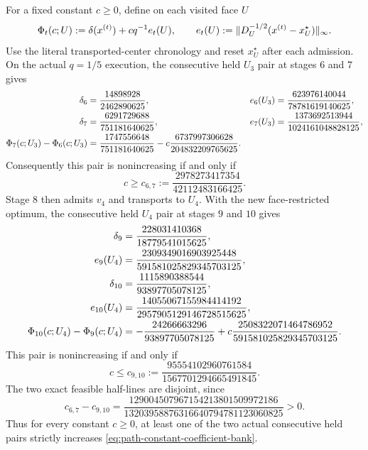 \begin{proposition}
\label{prop:path-no-constant-coefficient-bank}
For a fixed constant $c\geq0$, define on each visited face $U$
\begin{equation}
 \Phi_t(c;U):=\delta(x^{(t)})+c q^{-1}e_t(U),
 \qquad
 e_t(U):=\lVert D_U^{-1/2}(x^{(t)}-x_U^\star)\rVert_\infty .
 \label{eq:path-constant-coefficient-bank}
\end{equation}
Use the literal transported-center chronology and reset $x_U^\star$ after
each admission.  On the actual $q=1/5$ execution, the consecutive held
$U_3$ pair at stages $6$ and $7$ gives
\begin{align}
 \delta_6&=\frac{14898928}{2462890625},
 &e_6(U_3)&=\frac{623976140044}{78781619140625},
 \notag\\
 \delta_7&=\frac{6291729688}{751181640625},
 &e_7(U_3)&=\frac{1373692513944}{1024161048828125},
 \notag\\
 \Phi_7(c;U_3)-\Phi_6(c;U_3)
 &=\frac{1747556648}{751181640625}
   -c\frac{6737997306628}{204832209765625}.
 \label{eq:path-constant-coefficient-stage-seven-constraint}
\end{align}
Consequently this pair is nonincreasing if and only if
\begin{equation}
 c\geq c_{6,7}:=
 \frac{2978273417354}{42112483166425}.
 \label{eq:path-constant-coefficient-stage-seven-lower}
\end{equation}
Stage $8$ then admits $v_4$ and transports to $U_4$.  With the new
face-restricted optimum, the consecutive held $U_4$ pair at stages $9$ and
$10$ gives
\begin{align}
 \delta_9&=\frac{228031410368}{18779541015625},
 \notag\\
 e_9(U_4)&=\frac{2309349016903925448}{591581025829345703125},
 \notag\\
 \delta_{10}&=\frac{1115890388544}{93897705078125},
 \notag\\
 e_{10}(U_4)&=
 \frac{14055067155984414192}{2957905129146728515625},
 \notag\\
 \Phi_{10}(c;U_4)-\Phi_9(c;U_4)
 &=-\frac{24266663296}{93897705078125}
   +c\frac{2508322071464786952}{591581025829345703125}.
 \label{eq:path-constant-coefficient-stage-ten-constraint}
\end{align}
This pair is nonincreasing if and only if
\begin{equation}
 c\leq c_{9,10}:=
 \frac{95554102960761584}{1567701294665491845}.
 \label{eq:path-constant-coefficient-stage-ten-upper}
\end{equation}
The two exact feasible half-lines are disjoint, since
\begin{equation}
 c_{6,7}-c_{9,10}
 =\frac{129004507967154213801509972186}
        {13203958876316640794781123060825}>0.
 \label{eq:path-constant-coefficient-gap}
\end{equation}
Thus for every constant $c\geq0$, at least one of the two actual consecutive
held pairs strictly increases \cref{eq:path-constant-coefficient-bank}.


\end{proposition}

